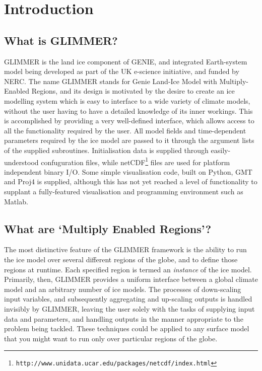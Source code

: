 \section{Introduction}

\subsection{What is GLIMMER?}

GLIMMER is the land ice component of GENIE, and integrated Earth-system model
being developed as part of the UK e-science initiative, and funded by
NERC. The name GLIMMER stands for Genie Land-Ice Model with Multiply-Enabled
Regions, and its design is motivated by the desire to
create an ice modelling system which is easy to interface to a wide variety of
climate models, without the user having to have a detailed knowledge of its
inner workings. This is
accomplished by providing a very well-defined interface, which allows access to
all the functionality required by the user. All model fields and
time-dependent parameters required by the ice model are passed to it through
the argument lists of the supplied subroutines. Initialisation data is
supplied through easily-understood confuguration files, while 
netCDF\footnote{\texttt{http://www.unidata.ucar.edu/packages/netcdf/index.html}} 
files are used for platform independent binary I/O. Some simple visualisation
code, built on Python, GMT and Proj4 is supplied, although this has not yet
reached a level of functionality to supplant a fully-featured visualisation
and programming environment such as Matlab.

\subsection{What are `Multiply Enabled Regions'?}

The most distinctive feature of the GLIMMER framework is the ability to
run the ice model over several different regions of the globe, and to define
those regions at runtime. Each specified region is termed an \emph{instance}
of the ice model. Primarily, then, GLIMMER provides a uniform interface
between a global climate model and an arbitrary number of ice models. The
processes of down-scaling input variables, and subsequently aggregating and
up-scaling outputs is handled invisibly by GLIMMER, leaving the user solely
with the tasks of supplying input data and parameters, and handling outputs in
the manner appropriate to the problem being tackled. These techniques could be
applied to any surface model that you might want to run only over
particular regions of the globe.

